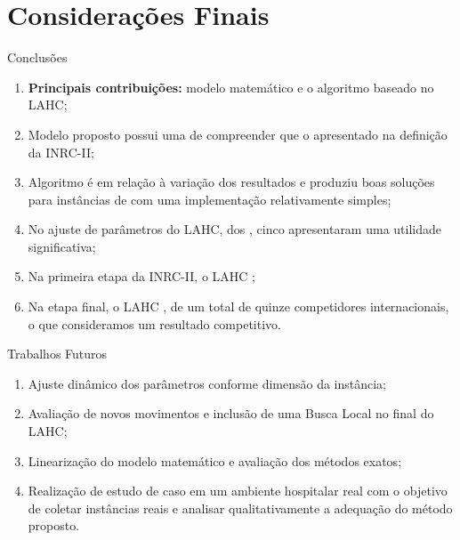 \documentclass[8pt,mathserif,professionalfont]{beamer}
\begin{document}
\section{Considerações Finais}

\begin{frame}{Conclusões}

\begin{enumerate}
	\item \textbf{Principais contribuições:} modelo matemático e o algoritmo baseado no LAHC;
		\item Modelo proposto possui uma  de compreender que o apresentado na definição da INRC-II;
		\item Algoritmo é  em relação à variação dos resultados e produziu boas soluções para instâncias de  com uma implementação relativamente simples;
		\item No ajuste de parâmetros do LAHC, dos , cinco apresentaram uma utilidade significativa;
		\item Na primeira etapa da INRC-II, o LAHC ;
		\item Na etapa final, o LAHC , de um total de quinze competidores internacionais, o que consideramos um resultado competitivo.
\end{enumerate}
\end{frame}


\begin{frame}{Trabalhos Futuros}
	\begin{enumerate}
		\item Ajuste dinâmico dos parâmetros conforme dimensão da instância;
		\item Avaliação de novos movimentos e inclusão de uma Busca Local no final do LAHC;
		\item Linearização do modelo matemático e avaliação dos métodos exatos;
		\item Realização de estudo de caso em um ambiente hospitalar real com o objetivo de coletar instâncias reais e analisar qualitativamente a adequação do método proposto.
	\end{enumerate}

\end{frame}
\end{document}
